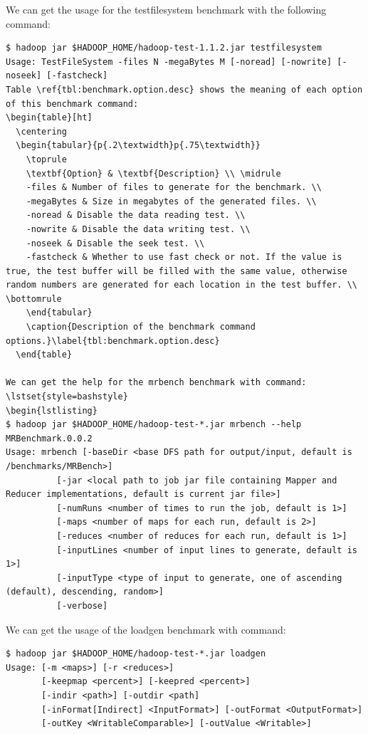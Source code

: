 We can get the usage for the testfilesystem benchmark with the following command:
\lstset{style=bashstyle}
\begin{lstlisting}
$ hadoop jar $HADOOP_HOME/hadoop-test-1.1.2.jar testfilesystem
Usage: TestFileSystem -files N -megaBytes M [-noread] [-nowrite] [-noseek] [-fastcheck]
Table \ref{tbl:benchmark.option.desc} shows the meaning of each option of this benchmark command:
\begin{table}[ht]
  \centering
  \begin{tabular}{p{.2\textwidth}p{.75\textwidth}}
    \toprule
    \textbf{Option} & \textbf{Description} \\ \midrule 
    -files & Number of files to generate for the benchmark. \\
    -megaBytes & Size in megabytes of the generated files. \\
    -noread & Disable the data reading test. \\ 
    -nowrite & Disable the data writing test. \\
    -noseek & Disable the seek test. \\
    -fastcheck & Whether to use fast check or not. If the value is true, the test buffer will be filled with the same value, otherwise random numbers are generated for each location in the test buffer. \\ \bottomrule
    \end{tabular}
    \caption{Description of the benchmark command options.}\label{tbl:benchmark.option.desc}
  \end{table}

We can get the help for the mrbench benchmark with command:
\lstset{style=bashstyle}
\begin{lstlisting}
$ hadoop jar $HADOOP_HOME/hadoop-test-*.jar mrbench --help
MRBenchmark.0.0.2
Usage: mrbench [-baseDir <base DFS path for output/input, default is /benchmarks/MRBench>]
          [-jar <local path to job jar file containing Mapper and Reducer implementations, default is current jar file>]
          [-numRuns <number of times to run the job, default is 1>]
          [-maps <number of maps for each run, default is 2>]
          [-reduces <number of reduces for each run, default is 1>]
          [-inputLines <number of input lines to generate, default is 1>]
          [-inputType <type of input to generate, one of ascending (default), descending, random>]
          [-verbose]
\end{lstlisting}

We can get the usage of the loadgen benchmark with command:
\lstset{style=bashstyle}
\begin{lstlisting}
$ hadoop jar $HADOOP_HOME/hadoop-test-*.jar loadgen
Usage: [-m <maps>] [-r <reduces>]
       [-keepmap <percent>] [-keepred <percent>]
       [-indir <path>] [-outdir <path]
       [-inFormat[Indirect] <InputFormat>] [-outFormat <OutputFormat>]
       [-outKey <WritableComparable>] [-outValue <Writable>]
\end{lstlisting}

